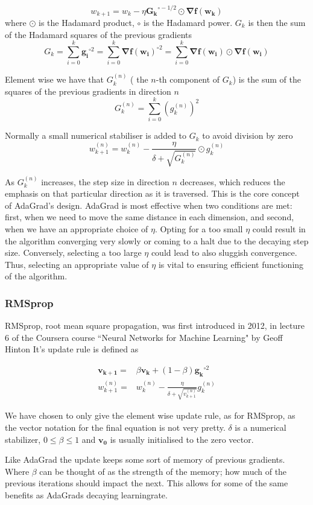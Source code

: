 \documentclass{article}
\theoremstyle{definition}
\begin{document}
\[ w_{k+1}= w_{k}-\eta \mathbf{G_{k}}^{\circ -1/2} \odot \mathbf{\nabla f(w_k)} \]
where $\odot$ is the Hadamard product, $\circ$ is the Hadamard power. $G_k$ is then the sum of the Hadamard squares of the previous gradients 
\begin{equation}
    G_k = \sum_{i = 0}^k \mathbf{g_i}^{\circ 2} = \sum_{i = 0}^k \mathbf{\nabla f(w_i)}^{\circ 2} = \sum_{i = 0}^k \mathbf{\nabla f(w_i)} \odot \mathbf{\nabla f(w_i)}
\end{equation}

 Element wise we have that $G_{k}^{(n)}$ ( the $n$-th component of $G_k$) is the sum of the squares of the previous gradients in direction $n$
 \[
 G_{k}^{(n)} = \sum_{i=0}^k  \left(g_k^{(n)}\right)^2 
 \]

 Normally a small numerical stabiliser is added to $G_k$ to avoid division by zero
 \[
 w_{k+1}^{(n)}= w_{k}^{(n)}- \frac{\eta}{\delta + \sqrt{G_{k}^{(n)}}} \odot g_k^{(n)}
 \]
 

As $G_k^{(n)}$ increases, the step size in direction $n$ decreases, which reduces the emphasis on that particular direction as it is traversed. This is the core concept of AdaGrad's design. AdaGrad is most effective when two conditions are met: first, when we need to move the same distance in each dimension, and second, when we have an appropriate choice of $\eta$. Opting for a too small $\eta$ could result in the algorithm converging very slowly or coming to a halt due to the decaying step size. Conversely, selecting a too large $\eta$ could lead to also sluggish convergence. Thus, selecting an appropriate value of $\eta$ is vital to ensuring efficient functioning of the algorithm. 


\subsubsection{RMSprop}
RMSprop, root mean square propagation, was first introduced in 2012, in lecture 6 of the Coursera course ``Neural Networks for Machine Learning" by Geoff Hinton
\cite{NNforML-Lecture6} It's update rule is defined as 

\begin{align*}
    \mathbf{v_{k+1}} =& \beta \mathbf{v_{k}} + (1-\beta) \mathbf{g_k}^{\circ 2}\\
    w_{k+1}^{(n)} =& w_k^{(n)} - \frac{\eta}{\delta +  \sqrt{v_{k+1}^{(n)}}} g_k^{(n)}
\end{align*}

 We have chosen to only give the element wise update rule, as for RMSprop, as the vector notation for the final equation is not very pretty. $\delta$ is a numerical stabilizer, $0\leq \beta \leq 1$ and $\mathbf{v_0}$ is usually initialised to the zero vector.
\par
\vspace{1mm}
Like AdaGrad the update keeps some sort of memory of previous gradients. Where $\beta$ can be thought of as the strength of the memory; how much of the previous iterations should impact the next. This allows for some of the same benefits as AdaGrads decaying learningrate.
\end{document}
